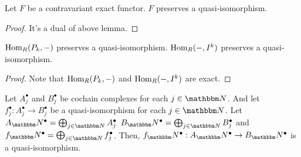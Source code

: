 \begin{lemma}
  Let \(F\) be a contravariant exact functor.
  \(F\) preserves a quasi-isomorphism.
\end{lemma}
\begin{proof}
  It's a dual of above lemma.
\end{proof}

\begin{lemma}\label{lem-pres}
  \(\textnormal{Hom}_R(P_k, -)\) preserves a quasi-isomorphism.
  \(\textnormal{Hom}_R(-, I^k)\) preserves a quasi-isomorphism.
\end{lemma}
\begin{proof}
  Note that \(\textnormal{Hom}_R(P_k, -)\) and \(\textnormal{Hom}_R(-, I^k)\) are exact.
\end{proof}

\begin{lemma}\label{lem-comp}
  Let \(A_j^\bullet\) and \(B_j^\bullet\) be cochain complexes for each \(j \in \bbN\).
  And let \(f_j^\bullet: A_j^\bullet \to B_j^\bullet\) be a quasi-isomorphism for each \(j \in \bbN\).
  Let
  \(A_\bbN^\bullet = \bigoplus_{j \in \bbN} A_j^\bullet\)
  \(B_\bbN^\bullet = \bigoplus_{j \in \bbN} B_j^\bullet\)
  and \(f_\bbN^\bullet = \bigoplus_{j \in \bbN} f_j^\bullet\).
  Then, \(f_\bbN^\bullet: A_\bbN^\bullet \to B_\bbN^\bullet\) is a quasi-isomorphism.
\end{lemma}
